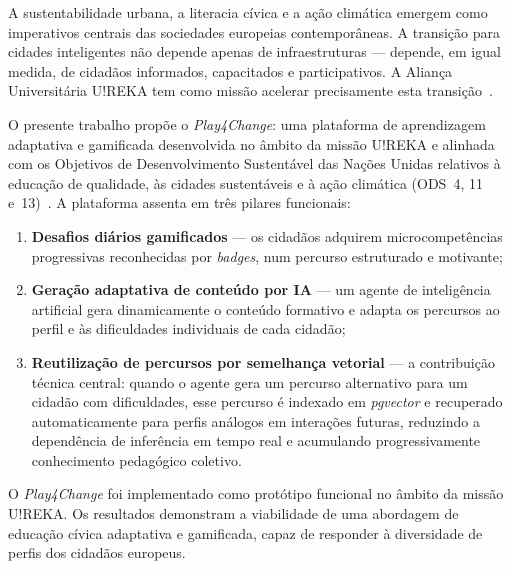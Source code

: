 \abstractPT  %

A sustentabilidade urbana, a literacia cívica e a ação climática emergem como imperativos
centrais das sociedades europeias contemporâneas. A transição para cidades inteligentes não
depende apenas de infraestruturas --- depende, em igual medida, de cidadãos informados,
capacitados e participativos. A Aliança Universitária U!REKA tem como missão acelerar
precisamente esta transição~\cite{ureka2024}.

O presente trabalho propõe o \textit{Play4Change}: uma plataforma de aprendizagem adaptativa
e gamificada desenvolvida no âmbito da missão U!REKA e alinhada com os Objetivos de
Desenvolvimento Sustentável das Nações Unidas relativos à educação de qualidade, às cidades
sustentáveis e à ação climática (ODS~4, 11 e~13)~\cite{un2015sdg}.
A plataforma assenta em três pilares funcionais:

\begin{enumerate}
  \item \textbf{Desafios diários gamificados} --- os cidadãos adquirem microcompetências
        progressivas reconhecidas por \textit{badges}, num percurso estruturado e motivante;

  \item \textbf{Geração adaptativa de conteúdo por IA} --- um agente de inteligência
        artificial gera dinamicamente o conteúdo formativo e adapta os percursos ao perfil
        e às dificuldades individuais de cada cidadão;

  \item \textbf{Reutilização de percursos por semelhança vetorial} --- a contribuição
        técnica central: quando o agente gera um percurso alternativo para um cidadão com
        dificuldades, esse percurso é indexado em \textit{pgvector} e recuperado
        automaticamente para perfis análogos em interações futuras, reduzindo a dependência
        de inferência em tempo real e acumulando progressivamente conhecimento pedagógico
        coletivo.
\end{enumerate}

O \textit{Play4Change} foi implementado como protótipo funcional no âmbito da missão U!REKA.
Os resultados demonstram a viabilidade de uma abordagem de educação cívica adaptativa e
gamificada, capaz de responder à diversidade de perfis dos cidadãos europeus.

